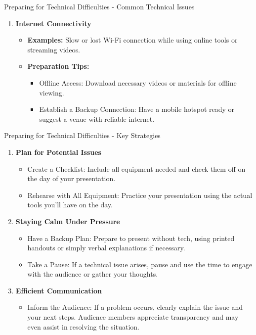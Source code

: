 \documentclass[aspectratio=169]{beamer}
\begin{document}
\begin{frame}[fragile]{Preparing for Technical Difficulties - Common Technical Issues}
\begin{enumerate}
        \item \textbf{Internet Connectivity}
        \begin{itemize}
            \item \textbf{Examples:} Slow or lost Wi-Fi connection while using online tools or streaming videos.
            \item \textbf{Preparation Tips:}
            \begin{itemize}
                \item Offline Access: Download necessary videos or materials for offline viewing.
                \item Establish a Backup Connection: Have a mobile hotspot ready or suggest a venue with reliable internet.
            \end{itemize}
        \end{itemize}
    \end{enumerate}
\end{frame}

\begin{frame}[fragile]{Preparing for Technical Difficulties - Key Strategies}
    \begin{enumerate}
        \item \textbf{Plan for Potential Issues}
        \begin{itemize}
            \item Create a Checklist: Include all equipment needed and check them off on the day of your presentation.
            \item Rehearse with All Equipment: Practice your presentation using the actual tools you’ll have on the day.
        \end{itemize}
        
        \item \textbf{Staying Calm Under Pressure}
        \begin{itemize}
            \item Have a Backup Plan: Prepare to present without tech, using printed handouts or simply verbal explanations if necessary.
            \item Take a Pause: If a technical issue arises, pause and use the time to engage with the audience or gather your thoughts.
        \end{itemize}
        
        \item \textbf{Efficient Communication}
        \begin{itemize}
            \item Inform the Audience: If a problem occurs, clearly explain the issue and your next steps. Audience members appreciate transparency and may even assist in resolving the situation.
        \end{itemize}
    \end{enumerate}
\end{frame}
\end{document}

